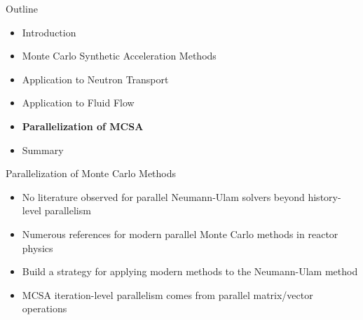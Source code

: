\documentclass{beamer}
\begin{document}
\begin{frame}{Outline}

  \begin{itemize}
  \item Introduction
    \bigskip
  \item Monte Carlo Synthetic Acceleration Methods
    \bigskip
  \item Application to Neutron Transport
    \bigskip
  \item Application to Fluid Flow
    \bigskip
  \item \textbf{Parallelization of MCSA}
    \bigskip
  \item Summary
  \end{itemize}

\end{frame}

\begin{frame}{Parallelization of Monte Carlo Methods}

  \begin{itemize}
  \item No literature observed for parallel Neumann-Ulam solvers
    beyond history-level parallelism
    \medskip \medskip
  \item Numerous references for modern parallel Monte Carlo methods in
    reactor physics
    \medskip \medskip
  \item Build a strategy for applying modern methods to the
    Neumann-Ulam method
    \medskip \medskip
  \item MCSA iteration-level parallelism comes from parallel
    matrix/vector operations
  \end{itemize}

\end{frame}
\end{document}
